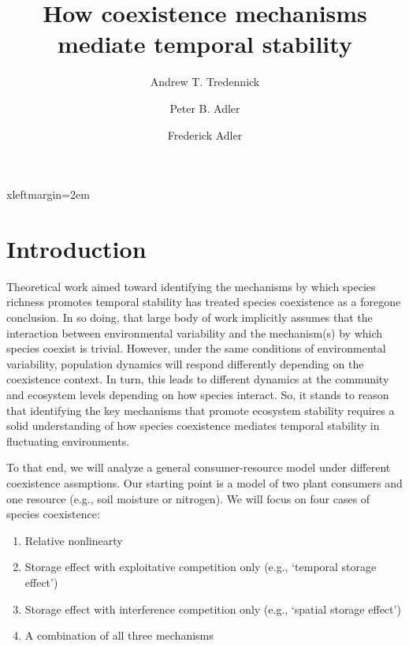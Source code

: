 \documentclass[12pt]{article}
\begin{document}



 {xleftmargin=2em}

\title{\LARGE How coexistence mechanisms mediate temporal stability}
\author[1]{\large Andrew T. Tredennick}
\author[1]{\large Peter B. Adler}
\author[2]{\large Frederick Adler}
\maketitle

\section{\large Introduction}
Theoretical work aimed toward identifying the mechanisms by which species richness promotes temporal stability has treated species coexistence as a foregone conclusion. In so doing, that large body of work implicitly assumes that the interaction between environmental variability and the mechanism(s) by which species coexist is trivial. However, under the same conditions of environmental variability, population dynamics will respond differently depending on the coexistence context. In turn, this leads to different dynamics at the community and ecosystem levels depending on how species interact. So, it stands to reason that identifying the key mechanisms that promote ecosystem stability requires a solid understanding of how species coexistence mediates temporal stability in fluctuating environments.

To that end, we will analyze a general consumer-resource model under different coexistence assmptions. Our starting point is a model of two plant consumers and one resource (e.g., soil moisture or nitrogen). We will focus on four cases of species coexistence:
\begin{enumerate}
  \item Relative nonlinearty
  \item Storage effect with exploitative competition only (e.g., `temporal storage effect')
  \item Storage effect with interference competition only (e.g., `spatial storage effect')
  \item A combination of all three mechanisms
\end{enumerate}
\end{document}

